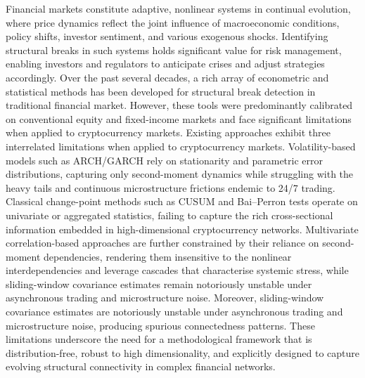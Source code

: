 \documentclass[11pt,reqno]{amsart}
\numberwithin{equation}{section} %
\begin{document}
Financial markets constitute adaptive, nonlinear systems in continual evolution, where price dynamics reflect the joint influence of macroeconomic conditions, policy shifts, 
investor sentiment, and various exogenous shocks\cite{hommes2001financial,grinols1993risk}. 
Identifying structural breaks in such systems holds significant value for risk management, enabling investors and regulators to anticipate crises and adjust strategies accordingly\citep{RN3950}. 
Over the past several decades, a rich array of econometric and 
statistical methods has been developed for structural break detection in traditional financial market\cite{timmermann2001structural,rodrik2013structural}.
However, these tools were predominantly calibrated on conventional equity and fixed-income markets and face significant limitations when applied to cryptocurrency markets\citep{RN3951}. 
Existing approaches exhibit three interrelated limitations when applied to cryptocurrency markets. Volatility-based models such as ARCH/GARCH rely on stationarity and parametric error distributions, capturing only second-moment dynamics while struggling with the heavy tails and continuous microstructure frictions endemic to 24/7 trading\cite{engle2001garch,katsiampa2017volatility}. 
Classical change-point methods such as CUSUM and Bai--Perron tests operate on univariate or aggregated statistics, failing to capture the rich cross-sectional information embedded in high-dimensional cryptocurrency networks\cite{bai1998estimating,RN3952}. 
Multivariate correlation-based approaches are further constrained by their reliance on second-moment dependencies, rendering them insensitive to the nonlinear interdependencies and leverage cascades that characterise systemic stress, while sliding-window covariance estimates remain notoriously unstable under asynchronous trading and microstructure noise\cite{RN3954,safikhani2022joint}.
Moreover, sliding-window covariance estimates are notoriously unstable under asynchronous trading and microstructure noise, producing spurious connectedness patterns\cite{safikhani2022joint}.
These limitations underscore the need for a methodological framework that is distribution-free, robust to high dimensionality, and explicitly designed to capture evolving structural connectivity in complex financial networks. 
\end{document}
